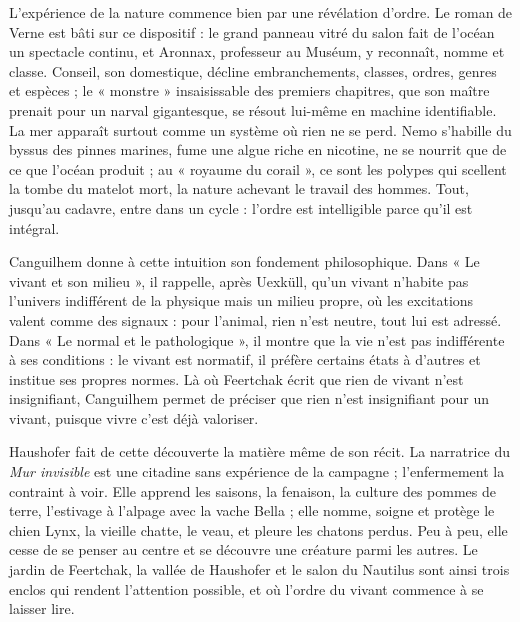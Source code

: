 \documentclass[11pt,a4paper]{article}
\begin{document}
L'expérience de la nature commence bien par une révélation d'ordre. Le roman de Verne est bâti sur ce dispositif : le grand panneau vitré du salon fait de l'océan un spectacle continu, et Aronnax, professeur au Muséum, y reconnaît, nomme et classe. Conseil, son domestique, décline embranchements, classes, ordres, genres et espèces ; le « monstre » insaisissable des premiers chapitres, que son maître prenait pour un narval gigantesque, se résout lui-même en machine identifiable. La mer apparaît surtout comme un système où rien ne se perd. Nemo s'habille du byssus des pinnes marines, fume une algue riche en nicotine, ne se nourrit que de ce que l'océan produit ; au « royaume du corail », ce sont les polypes qui scellent la tombe du matelot mort, la nature achevant le travail des hommes. Tout, jusqu'au cadavre, entre dans un cycle : l'ordre est intelligible parce qu'il est intégral.

Canguilhem donne à cette intuition son fondement philosophique. Dans « Le vivant et son milieu », il rappelle, après Uexküll, qu'un vivant n'habite pas l'univers indifférent de la physique mais un milieu propre, où les excitations valent comme des signaux : pour l'animal, rien n'est neutre, tout lui est adressé. Dans « Le normal et le pathologique », il montre que la vie n'est pas indifférente à ses conditions : le vivant est normatif, il préfère certains états à d'autres et institue ses propres normes. Là où Feertchak écrit que rien de vivant n'est insignifiant, Canguilhem permet de préciser que rien n'est insignifiant pour un vivant, puisque vivre c'est déjà valoriser.

Haushofer fait de cette découverte la matière même de son récit. La narratrice du \emph{Mur invisible} est une citadine sans expérience de la campagne ; l'enfermement la contraint à voir. Elle apprend les saisons, la fenaison, la culture des pommes de terre, l'estivage à l'alpage avec la vache Bella ; elle nomme, soigne et protège le chien Lynx, la vieille chatte, le veau, et pleure les chatons perdus. Peu à peu, elle cesse de se penser au centre et se découvre une créature parmi les autres. Le jardin de Feertchak, la vallée de Haushofer et le salon du Nautilus sont ainsi trois enclos qui rendent l'attention possible, et où l'ordre du vivant commence à se laisser lire.
\end{document}
